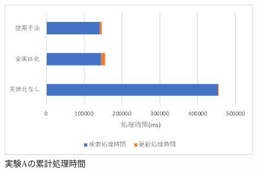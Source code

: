 \documentclass[a4paper,11pt]{ujreport}
\begin{document}
\begin{figure}[htbp]
	\begin{center}
		\includegraphics[width=30em]{src/ExperimentA-total.pdf} %
	\end{center}
	\caption{実験Aの累計処理時間}
	\label{figure:ExperimentA-total}
\end{figure}
\end{document}
